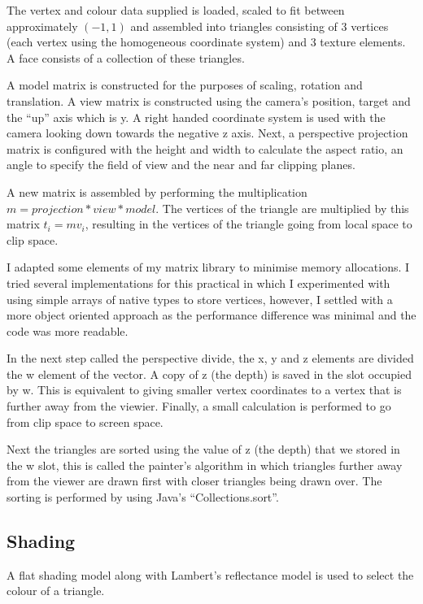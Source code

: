 \documentclass{article}
\begin{document}
The vertex and colour data supplied is loaded, scaled to fit between approximately $(-1, 1)$ and assembled into triangles consisting of 3 vertices (each vertex using the homogeneous coordinate system) and 3 texture elements. A face consists of a collection of these triangles.

A model matrix is constructed for the purposes of scaling, rotation and translation. A view matrix is constructed using the camera's position, target and the ``up'' axis which is y. A right handed coordinate system is used with the camera looking down towards the negative z axis. Next, a perspective projection matrix is configured with the height and width to calculate the aspect ratio, an angle to specify the field of view and the near and far clipping planes.

A new matrix is assembled by performing the multiplication $ m = \mathit{projection} * \mathit{view} * \mathit{model} $. The vertices of the triangle are multiplied by this matrix $ t_i = m v_i $, resulting in the vertices of the triangle going from local space to clip space.

I adapted some elements of my matrix library to minimise memory allocations. I tried several implementations for this practical in which I experimented with using simple arrays of native types to store vertices, however, I settled with a more object oriented approach as the performance difference was minimal and the code was more readable. 

In the next step called the perspective divide, the x, y and z elements are divided the w element of the vector. A copy of z (the depth) is saved in the slot occupied by w. This is equivalent to giving smaller vertex coordinates to a vertex that is further away from the viewier. Finally, a small calculation is performed to go from clip space to screen space.

Next the triangles are sorted using the value of z (the depth) that we stored in the w slot, this is called the painter's algorithm in which triangles further away from the viewer are drawn first with closer triangles being drawn over. The sorting is performed by using Java's ``Collections.sort''.



\subsection{Shading}

A flat shading model along with Lambert's reflectance model is used to select the colour of a triangle.
\end{document}
